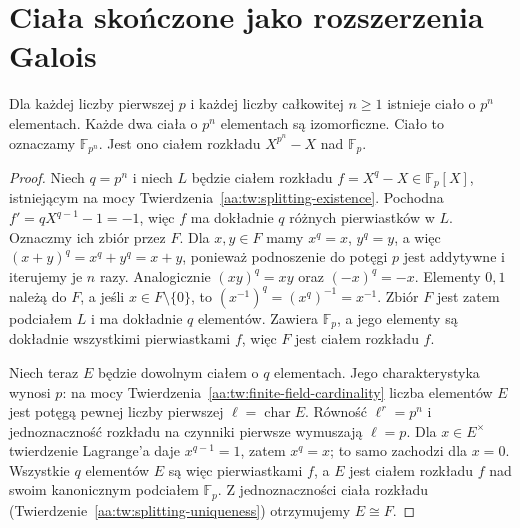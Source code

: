 \section{Ciała skończone jako rozszerzenia Galois}
\begin{twierdzenie}
\label{aa:tw:finite-fields-existence-uniqueness}
Dla każdej liczby pierwszej $p$ i każdej liczby całkowitej
$n\ge1$ istnieje ciało o $p^n$ elementach.
Każde dwa ciała o $p^n$ elementach są izomorficzne.
Ciało to oznaczamy $\mathbb F_{p^n}$. Jest ono ciałem
rozkładu $X^{p^n}-X$ nad $\mathbb F_p$.
\end{twierdzenie}
\begin{proof}
Niech $q=p^n$ i niech $L$ będzie ciałem rozkładu
$f=X^q-X\in\mathbb F_p[X]$, istniejącym na mocy
Twierdzenia~\ref{aa:tw:splitting-existence}. Pochodna
$f'=qX^{q-1}-1=-1$, więc $f$ ma dokładnie $q$
różnych pierwiastków w $L$. Oznaczmy ich zbiór przez $F$.
Dla $x,y\in F$ mamy $x^q=x$, $y^q=y$, a więc
$(x+y)^q=x^q+y^q=x+y$, ponieważ
podnoszenie do potęgi $p$ jest addytywne i iterujemy je
$n$ razy. Analogicznie $(xy)^q=xy$ oraz
$(-x)^q=-x$. Elementy $0,1$ należą do $F$,
a jeśli $x\in F\setminus\{0\}$, to
$(x^{-1})^q=(x^q)^{-1}=x^{-1}$.
Zbiór $F$ jest zatem podciałem $L$ i ma dokładnie
$q$ elementów. Zawiera $\mathbb F_p$, a jego elementy
są dokładnie wszystkimi pierwiastkami $f$, więc
$F$ jest ciałem rozkładu $f$.

Niech teraz $E$ będzie dowolnym ciałem o $q$ elementach.
Jego charakterystyka wynosi $p$: na mocy
Twierdzenia~\ref{aa:tw:finite-field-cardinality}
liczba elementów $E$ jest potęgą pewnej liczby
pierwszej $\ell=\operatorname{char}E$.
Równość $\ell^r=p^n$ i jednoznaczność rozkładu
na czynniki pierwsze wymuszają $\ell=p$.
Dla $x\in E^\times$ twierdzenie Lagrange'a daje
$x^{q-1}=1$, zatem $x^q=x$; to samo zachodzi dla $x=0$.
Wszystkie $q$ elementów $E$ są więc pierwiastkami $f$,
a $E$ jest ciałem rozkładu $f$ nad swoim kanonicznym
podciałem $\mathbb F_p$. Z jednoznaczności ciała
rozkładu (Twierdzenie~\ref{aa:tw:splitting-uniqueness})
otrzymujemy $E\cong F$.
\end{proof}

